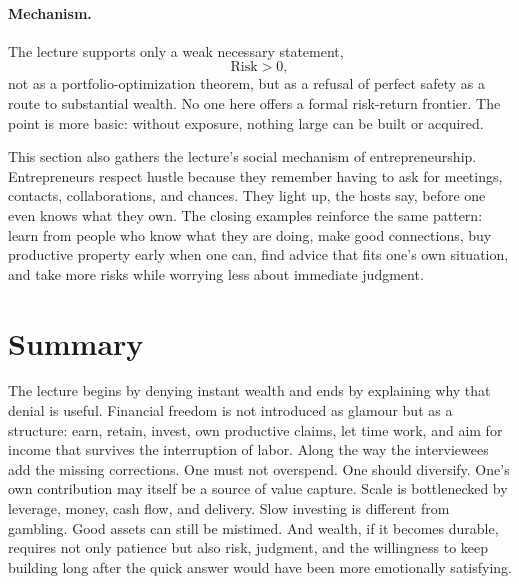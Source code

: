 \paragraph{Mechanism.}
The lecture supports only a weak necessary statement,
\begin{equation}
\text{Risk} > 0,
\end{equation}
not as a portfolio-optimization theorem, but as a refusal of perfect safety as a route to substantial wealth. No one here offers a formal risk-return frontier. The point is more basic: without exposure, nothing large can be built or acquired.

This section also gathers the lecture's social mechanism of entrepreneurship. Entrepreneurs respect hustle because they remember having to ask for meetings, contacts, collaborations, and chances. They light up, the hosts say, before one even knows what they own. The closing examples reinforce the same pattern: learn from people who know what they are doing, make good connections, buy productive property early when one can, find advice that fits one's own situation, and take more risks while worrying less about immediate judgment.

\section{Summary}

The lecture begins by denying instant wealth and ends by explaining why that denial is useful. Financial freedom is not introduced as glamour but as a structure: earn, retain, invest, own productive claims, let time work, and aim for income that survives the interruption of labor. Along the way the interviewees add the missing corrections. One must not overspend. One should diversify. One's own contribution may itself be a source of value capture. Scale is bottlenecked by leverage, money, cash flow, and delivery. Slow investing is different from gambling. Good assets can still be mistimed. And wealth, if it becomes durable, requires not only patience but also risk, judgment, and the willingness to keep building long after the quick answer would have been more emotionally satisfying.